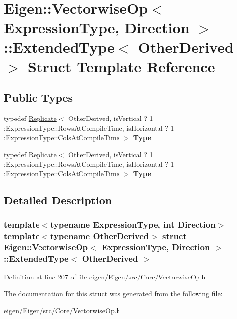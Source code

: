 \hypertarget{struct_eigen_1_1_vectorwise_op_1_1_extended_type}{}\section{Eigen\+:\+:Vectorwise\+Op$<$ Expression\+Type, Direction $>$\+:\+:Extended\+Type$<$ Other\+Derived $>$ Struct Template Reference}
\label{struct_eigen_1_1_vectorwise_op_1_1_extended_type}
\subsection*{Public Types}
\begin{DoxyCompactItemize}
\item 
\mbox{\label{struct_eigen_1_1_vectorwise_op_1_1_extended_type_a63e1778bf0805454e1b1d4b6fabdb167}} 
typedef \hyperlink{group___core___module_class_eigen_1_1_replicate}{Replicate}$<$ Other\+Derived, is\+Vertical ? 1 \+:Expression\+Type\+::\+Rows\+At\+Compile\+Time, is\+Horizontal ? 1 \+:Expression\+Type\+::\+Cols\+At\+Compile\+Time $>$ {\bfseries Type}
\item 
\mbox{\label{struct_eigen_1_1_vectorwise_op_1_1_extended_type_a63e1778bf0805454e1b1d4b6fabdb167}} 
typedef \hyperlink{group___core___module_class_eigen_1_1_replicate}{Replicate}$<$ Other\+Derived, is\+Vertical ? 1 \+:Expression\+Type\+::\+Rows\+At\+Compile\+Time, is\+Horizontal ? 1 \+:Expression\+Type\+::\+Cols\+At\+Compile\+Time $>$ {\bfseries Type}
\end{DoxyCompactItemize}


\subsection{Detailed Description}
\subsubsection*{template$<$typename Expression\+Type, int Direction$>$\newline
template$<$typename Other\+Derived$>$\newline
struct Eigen\+::\+Vectorwise\+Op$<$ Expression\+Type, Direction $>$\+::\+Extended\+Type$<$ Other\+Derived $>$}



Definition at line \hyperlink{eigen_2_eigen_2src_2_core_2_vectorwise_op_8h_source_l00207}{207} of file \hyperlink{eigen_2_eigen_2src_2_core_2_vectorwise_op_8h_source}{eigen/\+Eigen/src/\+Core/\+Vectorwise\+Op.\+h}.



The documentation for this struct was generated from the following file\+:\begin{DoxyCompactItemize}
\item 
eigen/\+Eigen/src/\+Core/\+Vectorwise\+Op.\+h\end{DoxyCompactItemize}
